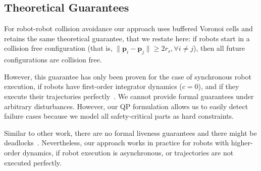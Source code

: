 \documentclass{svproc}
\newcommand{\vp}{\mathbf{p}}
\begin{document}

\subsection{Theoretical Guarantees} %

For robot-robot collision avoidance our approach uses buffered Voronoi cells and retains the same theoretical guarantee, that we restate here:
if robots start in a collision free configuration (that is, $\|\vp_i - \vp_j\| \geq 2r_s, \forall i\neq j$), then all future configurations are collision free.

However, this guarantee has only been proven for the case of synchronous robot execution, if robots have first-order integrator dynamics ($c=0$), and if they execute their trajectories perfectly~\cite{bufferedVoronoiCells}.
We cannot provide formal guarantees under arbitrary disturbances.
However, our QP formulation allows us to easily detect failure cases because we model all safety-critical parts as hard constraints.

Similar to other work, there are no formal liveness guarantees and there might be deadlocks~\cite{bufferedVoronoiCells}.
Nevertheless, our approach works in practice for robots with higher-order dynamics, if robot execution is asynchronous, or trajectories are not executed perfectly.




\end{document}
